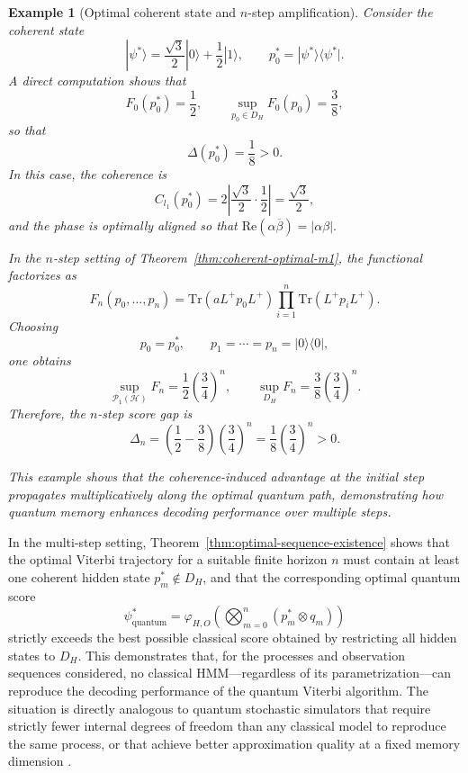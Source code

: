 \documentclass[12pt, reco]{article}
\newtheorem{example}[theorem]{Example}
\begin{document}
\begin{example}[Optimal coherent state and $n$-step amplification]
\label{ex:coherence-n-step}
Consider the coherent state
\[
|\psi^*\rangle
=
\frac{\sqrt{3}}{2}|0\rangle + \frac{1}{2}|1\rangle,
\qquad
p_0^* = |\psi^*\rangle\langle\psi^*|.
\]
A direct computation shows that
\[
F_0(p_0^*) = \frac{1}{2},
\qquad
\sup_{p_0 \in D_H} F_0(p_0) = \frac{3}{8},
\]
so that
\[
\Delta(p_0^*) = \frac{1}{8} > 0.
\]
In this case, the coherence is
\[
C_{l_1}(p_0^*) = 2 \left|\frac{\sqrt{3}}{2}\cdot \frac{1}{2}\right| = \frac{\sqrt{3}}{2},
\]
and the phase is optimally aligned so that
\(
\mathrm{Re}(\alpha\overline{\beta}) = |\alpha\beta|.
\)

\medskip

In the $n$-step setting of Theorem~\ref{thm:coherent-optimal-m1}, the functional factorizes as
\[
F_n(p_0,\dots,p_n)
=
\mathrm{Tr}(aL^+p_0L^+)\prod_{i=1}^n \mathrm{Tr}(L^+p_iL^+).
\]
Choosing
\[
p_0 = p_0^*,
\qquad
p_1 = \cdots = p_n = |0\rangle\langle0|,
\]
one obtains
\[
\sup_{\mathcal{P}_1(\mathcal{H})} F_n
=
\frac{1}{2}\left(\frac{3}{4}\right)^n,
\qquad
\sup_{D_H} F_n
=
\frac{3}{8}\left(\frac{3}{4}\right)^n.
\]
Therefore, the $n$-step score gap is
\[
\Delta_n
=
\left(\frac{1}{2} - \frac{3}{8}\right)\left(\frac{3}{4}\right)^n
=
\frac{1}{8}\left(\frac{3}{4}\right)^n > 0.
\]

\medskip

This example shows that the coherence-induced advantage at the initial step propagates multiplicatively along the optimal quantum path, demonstrating how quantum memory enhances decoding performance over multiple steps.
\end{example}

In the multi-step setting, Theorem~\ref{thm:optimal-sequence-existence} shows that the optimal Viterbi trajectory for a suitable finite horizon \(n\) must contain at least one coherent hidden state \(p_m^* \notin D_H\), and that the corresponding optimal quantum score
\[
\psi_{\mathrm{quantum}}^*
=
\varphi_{H,O}\!\left(\bigotimes_{m=0}^n (p_m^*\otimes q_m)\right)
\]
strictly exceeds the best possible classical score obtained by restricting all hidden states to \(D_H\). This demonstrates that, for the processes and observation sequences considered, no classical HMM—regardless of its parametrization—can reproduce the decoding performance of the quantum Viterbi algorithm. The situation is directly analogous to quantum stochastic simulators that require strictly fewer internal degrees of freedom than any classical model to reproduce the same process, or that achieve better approximation quality at a fixed memory dimension \cite{Banchi24,YangElliot25}.
\end{document}
